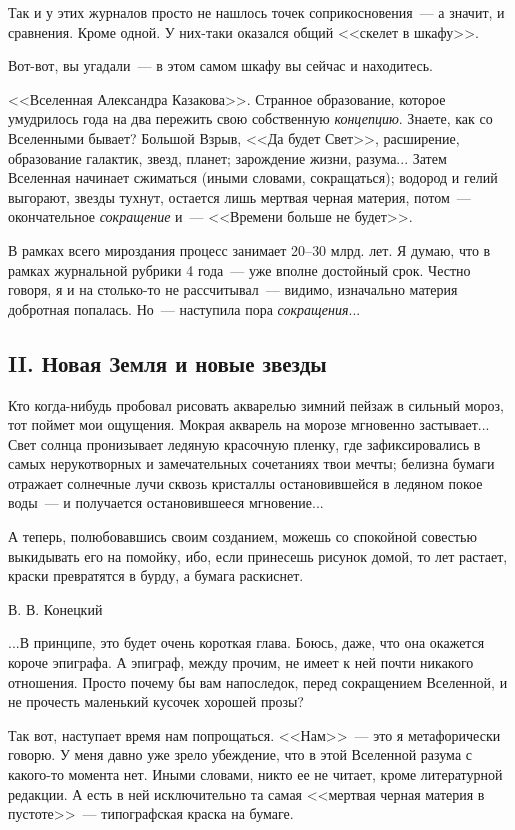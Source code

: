 \documentclass{scrbook}
\makeatletter
\newcommand{\bigepigraphwidth}{0.8} %
\newcommand{\defaultepigraphwidth}{0.5} %
\newcommand{\flqq}{<<}
\newcommand{\frqq}{>>}
\newcommand{\mdash}{~--- }
\newcommand{\ndash}{--}
\newcommand{\essaysection}[1]{\subsection*{#1}\nopagebreak}
\newcommand{\myepigraph}[3][\@empty]{
	\ifx\@empty#1
		\setlength{\epigraphwidth}{\defaultepigraphwidth\textwidth}
	\else
		\setlength{\epigraphwidth}{#1\textwidth}
	\fi
	\epigraph{#2}{#3}
	\setlength{\epigraphwidth}{\defaultepigraphwidth\textwidth} %
	\nopagebreak
}
\makeatother
\begin{document}
Так и у этих журналов просто не нашлось точек соприкосновения{\mdash}а значит, и сравнения. Кроме одной. У них-таки оказался общий {\flqq}скелет в шкафу{\frqq}.

Вот-вот, вы угадали{\mdash}в этом самом шкафу вы сейчас и находитесь.

{\flqq}Вселенная Александра Казакова{\frqq}. Странное образование, которое умудрилось года на два пережить свою собственную \emph{концепцию}. Знаете, как со Вселенными бывает? Большой Взрыв, {\flqq}Да будет Свет{\frqq}, расширение, образование галактик, звезд, планет; зарождение жизни, разума... Затем Вселенная начинает сжиматься (иными словами, сокращаться); водород и гелий выгорают, звезды тухнут, остается лишь мертвая черная материя, потом{\mdash}окончательное \emph{сокращение} и{\mdash}{\flqq}Времени больше не будет{\frqq}.

В рамках всего мироздания процесс занимает 20{\ndash}30 млрд. лет. Я думаю, что в рамках журнальной рубрики 4 года{\mdash}уже вполне достойный срок. Честно говоря, я и на столько-то не рассчитывал{\mdash}видимо, изначально материя добротная попалась. Но{\mdash}наступила пора \emph{сокращения}...

\essaysection{II. Новая Земля и новые звезды}

\myepigraph[\bigepigraphwidth]{Кто когда-нибудь пробовал рисовать акварелью зимний пейзаж в сильный мороз, тот поймет мои ощущения. Мокрая акварель на морозе мгновенно застывает... Свет солнца пронизывает ледяную красочную пленку, где зафиксировались в самых нерукотворных и замечательных сочетаниях твои мечты; белизна бумаги отражает солнечные лучи сквозь кристаллы остановившейся в ледяном покое воды{\mdash}и получается остановившееся мгновение...

А теперь, полюбовавшись своим созданием, можешь со спокойной совестью выкидывать его на помойку, ибо, если принесешь рисунок домой, то лет растает, краски превратятся в бурду, а бумага раскиснет.}
{В. В. Конецкий}

...В принципе, это будет очень короткая глава. Боюсь, даже, что она окажется короче эпиграфа. А эпиграф, между прочим, не имеет к ней почти никакого отношения. Просто почему бы вам напоследок, перед сокращением Вселенной, и не прочесть маленький кусочек хорошей прозы?

Так вот, наступает время нам попрощаться. {\flqq}Нам{\frqq}{\mdash}это я метафорически говорю. У меня давно уже зрело убеждение, что в этой Вселенной разума с какого-то момента нет. Иными словами, никто ее не читает, кроме литературной редакции. А есть в ней исключительно та самая {\flqq}мертвая черная материя в пустоте{\frqq}{\mdash}типографская краска на бумаге.
\end{document}
